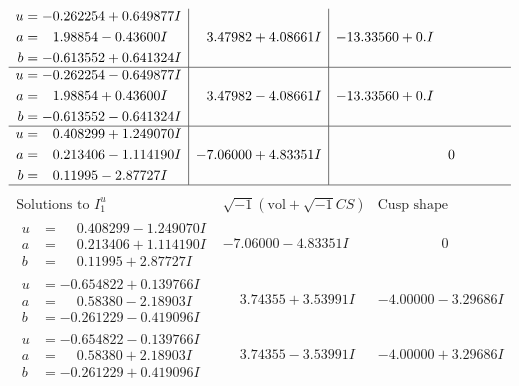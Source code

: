 \documentclass[1p]{elsarticle_modified}
\theoremstyle{definition}
\newcommand{\I}{\sqrt{-1}}
\begin{document}
$$\begin{array}{c|c|c}
\begin{aligned}
u &= -0.262254 + 0.649877 I \\
a &= \phantom{-}1.98854 - 0.43600 I \\
b &= -0.613552 + 0.641324 I\end{aligned}
 & \phantom{-}3.47982 + 4.08661 I & -13.33560 + 0. I\phantom{ +0.000000I} \\ \hline\begin{aligned}
u &= -0.262254 - 0.649877 I \\
a &= \phantom{-}1.98854 + 0.43600 I \\
b &= -0.613552 - 0.641324 I\end{aligned}
 & \phantom{-}3.47982 - 4.08661 I & -13.33560 + 0. I\phantom{ +0.000000I} \\ \hline\begin{aligned}
u &= \phantom{-}0.408299 + 1.249070 I \\
a &= \phantom{-}0.213406 - 1.114190 I \\
b &= \phantom{-}0.11995 - 2.87727 I\end{aligned}
 & -7.06000 + 4.83351 I & \phantom{-0.000000 } 0\\
 \hline 
 \end{array}$$\newpage$$\begin{array}{c|c|c}  
\text{Solutions to }I^u_{1}& \I (\text{vol} + \sqrt{-1}CS) & \text{Cusp shape}\\
 \hline 
\begin{aligned}
u &= \phantom{-}0.408299 - 1.249070 I \\
a &= \phantom{-}0.213406 + 1.114190 I \\
b &= \phantom{-}0.11995 + 2.87727 I\end{aligned}
 & -7.06000 - 4.83351 I & \phantom{-0.000000 } 0 \\ \hline\begin{aligned}
u &= -0.654822 + 0.139766 I \\
a &= \phantom{-}0.58380 - 2.18903 I \\
b &= -0.261229 - 0.419096 I\end{aligned}
 & \phantom{-}3.74355 + 3.53991 I & -4.00000 - 3.29686 I \\ \hline\begin{aligned}
u &= -0.654822 - 0.139766 I \\
a &= \phantom{-}0.58380 + 2.18903 I \\
b &= -0.261229 + 0.419096 I\end{aligned}
 & \phantom{-}3.74355 - 3.53991 I & -4.00000 + 3.29686 I \\ \hline\begin{aligned}

\end{aligned}
\end{array}$$
\end{document}
